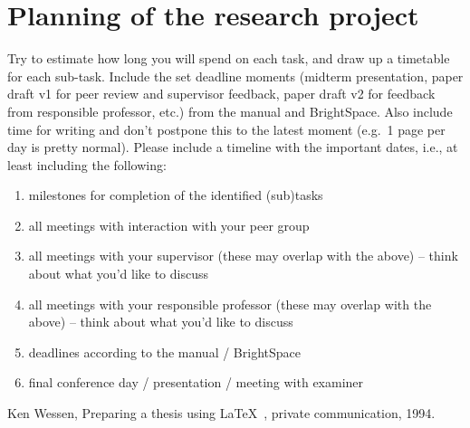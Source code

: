 \documentclass[english]{article}
\begin{document}
\section*{Planning of the research project}
Try to estimate how long you will spend on each task, and draw up a timetable for each sub-task.
Include the set deadline moments (midterm presentation, paper draft v1 for peer review and supervisor feedback, paper draft v2 for feedback from responsible professor, etc.) from the manual and BrightSpace. Also include time for writing and don't postpone this to the latest moment (e.g.\ 1 page per day is pretty normal).
Please include a timeline with the important dates, i.e., at least including the following:
\begin{enumerate}
\item milestones for completion of the identified (sub)tasks
\item all meetings with interaction with your peer group
\item all meetings with your supervisor (these may overlap with the above) -- think about what you'd like to discuss
\item all meetings with your responsible professor (these may overlap with the above)  -- think about what you'd like to discuss
\item deadlines according to the manual / BrightSpace
\item final conference day / presentation / meeting with examiner
\end{enumerate}

%
%

\begin{thebibliography}{9}
 Ken Wessen, Preparing a thesis using \LaTeX~, private
communication, 1994.
\end{thebibliography}
\end{document}
